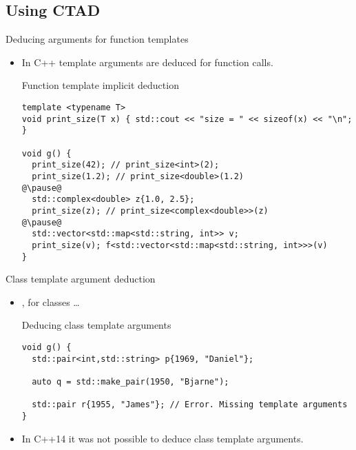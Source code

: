 \subsection{Using CTAD}

\begin{frame}[t,fragile]{Deducing arguments for function templates}
\begin{itemize}
  \item In C++ template arguments are 
        deduced for function calls.
\begin{block}{Function template implicit deduction}
\begin{lstlisting}[escapechar=@]
template <typename T>
void print_size(T x) { std::cout << "size = " << sizeof(x) << "\n"; }

void g() {
  print_size(42); // print_size<int>(2);
  print_size(1.2); // print_size<double>(1.2)
@\pause@   
  std::complex<double> z{1.0, 2.5};
  print_size(z); // print_size<complex<double>>(z)
@\pause@   
  std::vector<std::map<std::string, int>> v;
  print_size(v); f<std::vector<std::map<std::string, int>>>(v)
}
\end{lstlisting}
\end{block}
\end{itemize}
\end{frame}

\begin{frame}[t,fragile]{Class template argument deduction}
\begin{itemize}
  \item {}, for classes \ldots
\begin{block}{Deducing class template arguments}
\begin{lstlisting}
void g() {
  std::pair<int,std::string> p{1969, "Daniel"};

  auto q = std::make_pair(1950, "Bjarne");

  std::pair r{1955, "James"}; // Error. Missing template arguments 
}
\end{lstlisting}
\end{block}

  \item In C++14 it was not possible to deduce class template arguments.

\end{itemize}
\end{frame}

